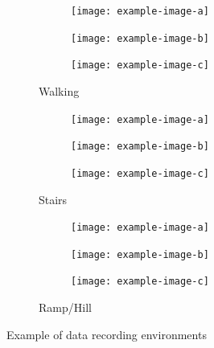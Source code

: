\begin{figure}[!hbt]
     \centering
     \begin{subfigure}[b]{\textwidth}
         \centering
         \begin{subfigure}[b]{0.32\textwidth}
             \centering
             \texttt{[image: example-image-a]}
        \end{subfigure}
        \hfill
         \begin{subfigure}[b]{0.32\textwidth}
             \centering
             \texttt{[image: example-image-b]}
        \end{subfigure}
        \hfill
        \begin{subfigure}[b]{0.32\textwidth}
             \centering
             \texttt{[image: example-image-c]}
        \end{subfigure}
        \caption{Walking}
        \label{fig:methods-flat-example}
      \end{subfigure}
      \newline
      
      \begin{subfigure}[b]{\textwidth}
         \centering
         \begin{subfigure}[b]{0.32\textwidth}
             \centering
             \texttt{[image: example-image-a]}
        \end{subfigure}
        \hfill
         \begin{subfigure}[b]{0.32\textwidth}
             \centering
             \texttt{[image: example-image-b]}
        \end{subfigure}
        \hfill
        \begin{subfigure}[b]{0.32\textwidth}
             \centering
             \texttt{[image: example-image-c]}
        \end{subfigure}
        \caption{Stairs}
        \label{fig:methods-stair-example}
      \end{subfigure}
      \newline
      
      \begin{subfigure}[b]{\textwidth}
         \centering
         \begin{subfigure}[b]{0.32\textwidth}
             \centering
             \texttt{[image: example-image-a]}
        \end{subfigure}
        \hfill
         \begin{subfigure}[b]{0.32\textwidth}
             \centering
             \texttt{[image: example-image-b]}
        \end{subfigure}
        \hfill
        \begin{subfigure}[b]{0.32\textwidth}
             \centering
             \texttt{[image: example-image-c]}
        \end{subfigure}
        \caption{Ramp/Hill}
        \label{fig:methods-ramp-example}
      \end{subfigure}
    \caption{Example of data recording environments}
    \label{fig:three graphs}
\end{figure}


